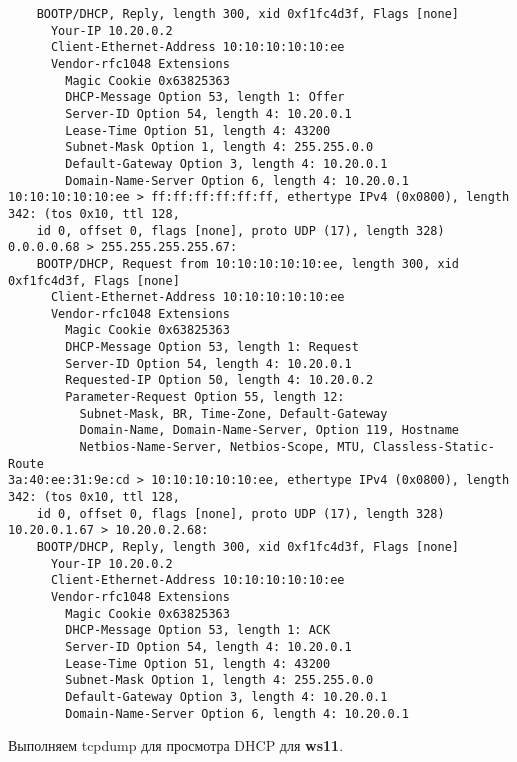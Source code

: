 \documentclass[a4paper,12pt]{article}
\begin{document}
\begin{Verbatim}
	BOOTP/DHCP, Reply, length 300, xid 0xf1fc4d3f, Flags [none]
	  Your-IP 10.20.0.2
	  Client-Ethernet-Address 10:10:10:10:10:ee
	  Vendor-rfc1048 Extensions
	    Magic Cookie 0x63825363
	    DHCP-Message Option 53, length 1: Offer
	    Server-ID Option 54, length 4: 10.20.0.1
	    Lease-Time Option 51, length 4: 43200
	    Subnet-Mask Option 1, length 4: 255.255.0.0
	    Default-Gateway Option 3, length 4: 10.20.0.1
	    Domain-Name-Server Option 6, length 4: 10.20.0.1
10:10:10:10:10:ee > ff:ff:ff:ff:ff:ff, ethertype IPv4 (0x0800), length 342: (tos 0x10, ttl 128,
	id 0, offset 0, flags [none], proto UDP (17), length 328) 0.0.0.0.68 > 255.255.255.255.67:
	BOOTP/DHCP, Request from 10:10:10:10:10:ee, length 300, xid 0xf1fc4d3f, Flags [none]
	  Client-Ethernet-Address 10:10:10:10:10:ee
	  Vendor-rfc1048 Extensions
	    Magic Cookie 0x63825363
	    DHCP-Message Option 53, length 1: Request
	    Server-ID Option 54, length 4: 10.20.0.1
	    Requested-IP Option 50, length 4: 10.20.0.2
	    Parameter-Request Option 55, length 12:
	      Subnet-Mask, BR, Time-Zone, Default-Gateway
	      Domain-Name, Domain-Name-Server, Option 119, Hostname
	      Netbios-Name-Server, Netbios-Scope, MTU, Classless-Static-Route
3a:40:ee:31:9e:cd > 10:10:10:10:10:ee, ethertype IPv4 (0x0800), length 342: (tos 0x10, ttl 128,
	id 0, offset 0, flags [none], proto UDP (17), length 328) 10.20.0.1.67 > 10.20.0.2.68:
	BOOTP/DHCP, Reply, length 300, xid 0xf1fc4d3f, Flags [none]
	  Your-IP 10.20.0.2
	  Client-Ethernet-Address 10:10:10:10:10:ee
	  Vendor-rfc1048 Extensions
	    Magic Cookie 0x63825363
	    DHCP-Message Option 53, length 1: ACK
	    Server-ID Option 54, length 4: 10.20.0.1
	    Lease-Time Option 51, length 4: 43200
	    Subnet-Mask Option 1, length 4: 255.255.0.0
	    Default-Gateway Option 3, length 4: 10.20.0.1
	    Domain-Name-Server Option 6, length 4: 10.20.0.1
\end{Verbatim}

Выполняем tcpdump для просмотра DHCP для \textbf{ws11}.
\end{document}
